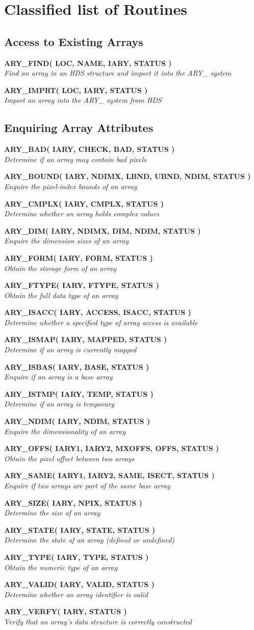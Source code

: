 \documentclass[twoside,11pt]{article}
\newcommand{\xlabel}[1]{}
\newcommand{\noteroutine}[2]{\textbf{#1}\hspace*{\fill}\nopagebreak \\
                             \hspace*{3em}\emph{#2}\hspace*{\fill}\par}
\begin{document}
\newpage
\section{\xlabel{classified_list_of_routines}Classified list of Routines}
\label{classified_list_of_routines}


\subsection{\xlabel{access_to_existing_arrays}Access to Existing Arrays}
\label{access_to_existing_arrays}

\noteroutine{ARY\_FIND( LOC, NAME, IARY, STATUS )}
            {Find an array in an HDS structure and import it into the ARY\_ system}
\noteroutine{ARY\_IMPRT( LOC, IARY, STATUS )}
            {Import an array into the ARY\_ system from HDS}


\subsection{\xlabel{enquiring_array_attributes}Enquiring Array Attributes}
\label{enquiring_array_attributes}

\noteroutine{ARY\_BAD( IARY, CHECK, BAD, STATUS )}
            {Determine if an array may contain bad pixels}
\noteroutine{ARY\_BOUND( IARY, NDIMX, LBND, UBND, NDIM, STATUS )}
            {Enquire the pixel-index bounds of an array}
\noteroutine{ARY\_CMPLX( IARY, CMPLX, STATUS )}
            {Determine whether an array holds complex values}
\noteroutine{ARY\_DIM( IARY, NDIMX, DIM, NDIM, STATUS )}
            {Enquire the dimension sizes of an array}
\noteroutine{ARY\_FORM( IARY, FORM, STATUS )}
            {Obtain the storage form of an array}
\noteroutine{ARY\_FTYPE( IARY, FTYPE, STATUS )}
            {Obtain the full data type of an array}
\noteroutine{ARY\_ISACC( IARY, ACCESS, ISACC, STATUS )}
            {Determine whether a specified type of array access is available}
\noteroutine{ARY\_ISMAP( IARY, MAPPED, STATUS )}
            {Determine if an array is currently mapped}
\noteroutine{ARY\_ISBAS( IARY, BASE, STATUS )}
            {Enquire if an array is a base array}
\noteroutine{ARY\_ISTMP( IARY, TEMP, STATUS )}
            {Determine if an array is temporary}
\noteroutine{ARY\_NDIM( IARY, NDIM, STATUS )}
            {Enquire the dimensionality of an array}
\noteroutine{ARY\_OFFS( IARY1, IARY2, MXOFFS, OFFS, STATUS )}
            {Obtain the pixel offset between two arrays}
\noteroutine{ARY\_SAME( IARY1, IARY2, SAME, ISECT, STATUS )}
            {Enquire if two arrays are part of the same base array}
\noteroutine{ARY\_SIZE( IARY, NPIX, STATUS )}
            {Determine the size of an array}
\noteroutine{ARY\_STATE( IARY, STATE, STATUS )}
            {Determine the state of an array (defined or undefined)}
\noteroutine{ARY\_TYPE( IARY, TYPE, STATUS )}
            {Obtain the numeric type of an array}
\noteroutine{ARY\_VALID( IARY, VALID, STATUS )}
            {Determine whether an array identifier is valid}
\noteroutine{ARY\_VERFY( IARY, STATUS )}
            {Verify that an array's data structure is correctly constructed}
\end{document}
